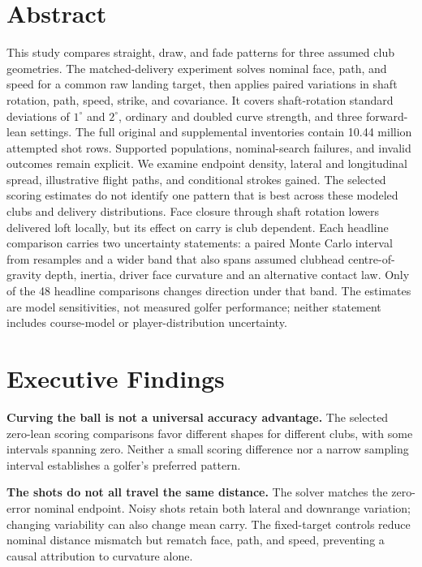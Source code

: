 \documentclass[11pt,letterpaper]{article}
\begin{document}
\section*{Abstract}
This study compares straight, draw, and fade patterns for three assumed club
geometries. The matched-delivery experiment solves nominal face, path, and
speed for a common raw landing target, then applies paired variations in
shaft rotation, path, speed, strike, and covariance. It covers shaft-rotation
standard deviations of $1^\circ$ and $2^\circ$, ordinary and doubled curve
strength, and three forward-lean settings. The full original and supplemental
inventories contain 10.44 million attempted shot rows. Supported populations,
nominal-search failures, and invalid outcomes remain explicit. We examine
endpoint density, lateral and longitudinal spread, illustrative flight paths,
and conditional strokes gained. The selected scoring estimates do not identify one pattern that is best
across these modeled clubs and delivery distributions. Face closure through shaft rotation lowers delivered
loft locally, but its effect on carry is club dependent. Each headline
comparison carries two uncertainty statements: a paired Monte Carlo interval
from \BootstrapResamples{} resamples and a wider band that also spans assumed
clubhead centre-of-gravity depth, inertia, driver face curvature and an
alternative contact law. Only \BandDirectionChanges{} of the 48 headline
comparisons changes direction under that band. The estimates are model
sensitivities, not measured golfer performance; neither statement includes
course-model or player-distribution uncertainty.
{\setlength{\parskip}{0pt}\tableofcontents}
\clearpage
\section{Executive Findings}
\textbf{Curving the ball is not a universal accuracy advantage.}
The selected zero-lean scoring comparisons favor different shapes for different
clubs, with some intervals spanning zero. Neither a small scoring difference
nor a narrow sampling interval establishes a golfer's preferred pattern.

\textbf{The shots do not all travel the same distance.}
The solver matches the zero-error nominal endpoint. Noisy shots retain both
lateral and downrange variation; changing variability can also change mean
carry. The fixed-target controls reduce nominal distance mismatch but rematch
face, path, and speed, preventing a causal attribution to curvature alone.
\end{document}

